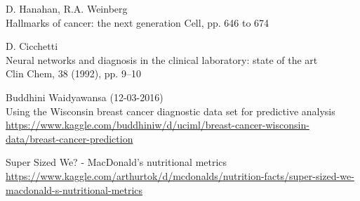 \cleardoublepage
{}
{}
\begin{thebibliography}{99}

D. Hanahan, R.A. Weinberg \\
Hallmarks of cancer: the next generation Cell, pp. 646 to 674

D. Cicchetti\\
Neural networks and diagnosis in the clinical laboratory: state of the art\\Clin Chem, 38 (1992), pp. 9–10

Buddhini Waidyawansa (12-03-2016)\\Using the Wisconsin breast cancer diagnostic data set for predictive analysis\\
\url{https://www.kaggle.com/buddhiniw/d/uciml/breast-cancer-wisconsin-data/breast-cancer-prediction}

Super Sized We? - MacDonald's nutritional metrics\\
\url{https://www.kaggle.com/arthurtok/d/mcdonalds/nutrition-facts/super-sized-we-macdonald-s-nutritional-metrics}
\end{thebibliography}